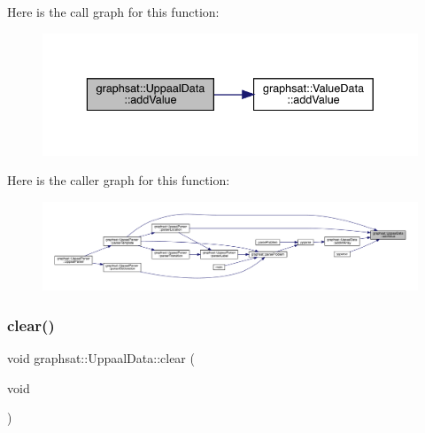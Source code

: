 Here is the call graph for this function\+:\nopagebreak
\begin{figure}[H]
\begin{center}
\leavevmode
\includegraphics[width=336pt]{classgraphsat_1_1_uppaal_data_a50f0cab2fb2e5624b39068e49d4c51ee_cgraph}
\end{center}
\end{figure}
Here is the caller graph for this function\+:\nopagebreak
\begin{figure}[H]
\begin{center}
\leavevmode
\includegraphics[width=350pt]{classgraphsat_1_1_uppaal_data_a50f0cab2fb2e5624b39068e49d4c51ee_icgraph}
\end{center}
\end{figure}
\mbox{\label{classgraphsat_1_1_uppaal_data_a470caa8beeb50129e99a4ca086bc71c0}} 
\subsubsection{\texorpdfstring{clear()}{clear()}}
{\footnotesize\ttfamily void graphsat\+::\+Uppaal\+Data\+::clear (\begin{DoxyParamCaption}\item[{void}]{ }\end{DoxyParamCaption})\hspace{0.3cm}{\ttfamily [inline]}}


